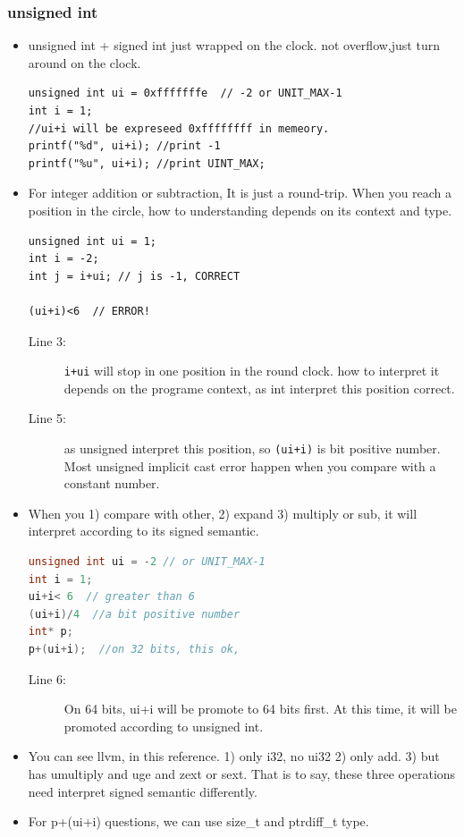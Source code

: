 \documentclass[a4paper,11pt,twoside]{book}
\begin{document}
\subsubsection{unsigned int}
\begin{itemize}
	\item unsigned int + signed int just wrapped on the clock. not overflow,just turn around on the clock. 
	
\begin{lstlisting}[numbers=none]
unsigned int ui = 0xfffffffe  // -2 or UNIT_MAX-1
int i = 1;
//ui+i will be expreseed 0xffffffff in memeory. 
printf("%d", ui+i); //print -1
printf("%u", ui+i); //print UINT_MAX;
\end{lstlisting}

	\item For integer addition or subtraction, It is just a round-trip. When you reach a position in the circle, how to understanding depends on its context and type.
\begin{lstlisting}
unsigned int ui = 1;
int i = -2;
int j = i+ui; // j is -1, CORRECT

(ui+i)<6  // ERROR!
\end{lstlisting}
\begin{description}
	\item[Line 3:] \texttt{i+ui} will stop in one position in the round clock. how to interpret it depends on the programe context, as int interpret this position correct.
	\item[Line 5:]  as unsigned interpret this position, so \texttt{(ui+i)} is bit positive number. Most unsigned implicit cast error happen when you compare with a constant number.
\end{description}
	
	\item When you 1) compare with other, 2) expand 3) multiply or sub, it will interpret according to its signed semantic. 
\begin{lstlisting}[frame=single, language=c++]
unsigned int ui = -2 // or UNIT_MAX-1
int i = 1;
ui+i< 6  // greater than 6
(ui+i)/4  //a bit positive number
int* p;
p+(ui+i);  //on 32 bits, this ok, 
\end{lstlisting}
\begin{description}
	\item[Line 6:] On 64 bits, ui+i will be promote to 64 bits first. At this time, it will be promoted according to unsigned int.
\end{description}
	
	\item You can see llvm, in this reference. 1) only i32, no ui32 2) only add.  3) but has umultiply and uge and zext or sext. That is to say, these three operations need interpret signed semantic differently. 
	
	\item For p+(ui+i) questions, we can use size\_t and ptrdiff\_t type. 
\end{itemize}
\end{document}
